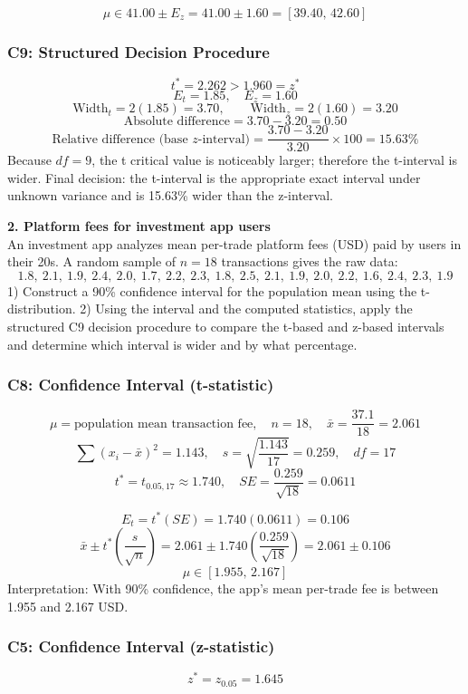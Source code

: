 \begin{ExamProblems}
		\[
		\mu\in 41.00\pm E_z=41.00\pm 1.60=[39.40,\,42.60]
		\]

		\subsubsection*{C9: Structured Decision Procedure}
		\[
		t^*=2.262>1.960=z^*
		\]
		\[
		E_t=1.85,\quad E_z=1.60
		\]
		\[
		\text{Width}_t=2(1.85)=3.70,\qquad \text{Width}_z=2(1.60)=3.20
		\]
		\[
		\text{Absolute difference}=3.70-3.20=0.50
		\]
		\[
		\text{Relative difference (base }z\text{-interval)}=\frac{3.70-3.20}{3.20}\times 100=15.63\%
		\]
		Because $df=9$, the t critical value is noticeably larger; therefore the t-interval is wider.
		Final decision: the t-interval is the appropriate exact interval under unknown variance and is 15.63\% wider than the z-interval.

		\newpage
		\item
		\textbf{2. Platform fees for investment app users}\\
		An investment app analyzes mean per-trade platform fees (USD) paid by users in their 20s.
		A random sample of $n=18$ transactions gives the raw data:
		\[
		1.8,\ 2.1,\ 1.9,\ 2.4,\ 2.0,\ 1.7,\ 2.2,\ 2.3,\ 1.8,\ 2.5,\ 2.1,\ 1.9,\ 2.0,\ 2.2,\ 1.6,\ 2.4,\ 2.3,\ 1.9
		\]
		1) Construct a 90\% confidence interval for the population mean using the t-distribution.
		2) Using the interval and the computed statistics, apply the structured C9 decision procedure to compare the t-based and z-based intervals and determine which interval is wider and by what percentage.

		\subsubsection*{C8: Confidence Interval (t-statistic)}
		\[
		\mu=\text{population mean transaction fee},\quad n=18,\quad \bar{x}=\frac{37.1}{18}=2.061
		\]
		\[
		\sum (x_i-\bar{x})^2=1.143,\quad s=\sqrt{\frac{1.143}{17}}=0.259,\quad df=17
		\]
		\[
		t^*=t_{0.05,17}\approx 1.740,\quad SE=\frac{0.259}{\sqrt{18}}=0.0611
		\]

		\[
		E_t=t^*(SE)=1.740(0.0611)=0.106
		\]
		\[
		\bar{x}\pm t^*\left(\frac{s}{\sqrt{n}}\right)=2.061\pm 1.740\left(\frac{0.259}{\sqrt{18}}\right)=2.061\pm 0.106
		\]
		\[
		\mu\in[1.955,\,2.167]
		\]
		Interpretation: With 90\% confidence, the app's mean per-trade fee is between 1.955 and 2.167 USD.

		\subsubsection*{C5: Confidence Interval (z-statistic)}
		\[
		z^*=z_{0.05}=1.645
		\]


\end{ExamProblems}
